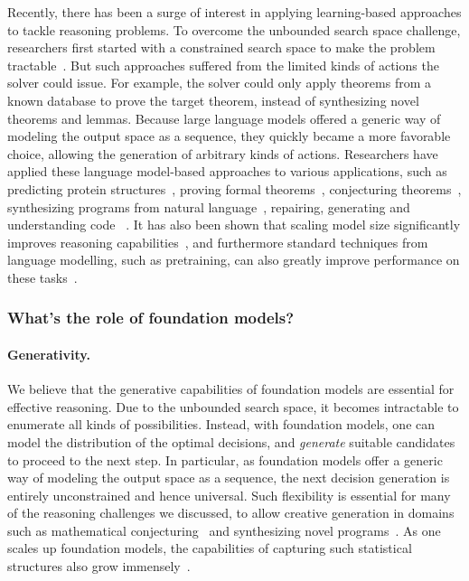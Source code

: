 Recently, there has been a surge of interest in applying learning-based approaches to tackle reasoning problems. To overcome the unbounded search space challenge, researchers first started with a constrained search space to make the problem tractable~\citep{DBLP:journals/corr/abs-1806-00608, DBLP:conf/icml/BansalLRSW19}. But such approaches suffered from the limited kinds of actions the solver could issue. For example, the solver could only apply theorems from a known database to prove the target theorem, instead of synthesizing novel theorems and lemmas. Because large language models offered a generic way of modeling the output space as a sequence, they quickly became a more favorable choice, allowing the generation of arbitrary kinds of actions. Researchers have applied these language model-based approaches to various applications, such as predicting protein structures~\citep{DBLP:journals/nature/Senior0JKSGQZNB20}, proving formal theorems~\citep{DBLP:journals/corr/polu2020generative,pact},  conjecturing theorems~\citep{DBLP:conf/mkm/UrbanJ20,DBLP:journals/corr/abs-2006-04757,li2021isarstep}, synthesizing programs from natural language~\cite{chen2021evaluating,ling2016latent}, repairing, generating and understanding code ~\citep{yasunaga2021break,DBLP:journals/corr/abs-2102-04664,guo2020graphcodebert,svyatkovskiy2020intellicode,kim2021code,zugner2021language}. It has also been shown that scaling model size significantly improves reasoning capabilities~\citep{DBLP:journals/corr/polu2020generative}, and furthermore standard techniques from language modelling, such as pretraining, can also greatly improve performance on these tasks~\citep{DBLP:journals/corr/abs-2006-04757,DBLP:journals/corr/polu2020generative}.

\subsubsection{What's the role of foundation models?}
\label{sec:reasoning-role}

\paragraph{Generativity.} We believe that the generative capabilities of foundation models are essential for effective reasoning. Due to the unbounded search space, it becomes intractable to enumerate all kinds of possibilities. Instead, with foundation models, one can model the distribution of the optimal decisions, and \emph{generate} suitable candidates to proceed to the next step. In particular, as foundation models offer a generic way of modeling the output space as a sequence, the next decision generation is entirely unconstrained and hence universal. Such flexibility is essential for many of the reasoning challenges we discussed, to allow creative generation in domains such as mathematical conjecturing~\cite{li2021isarstep} and synthesizing novel programs~\cite{chen2021evaluating}. As one scales up foundation models, the capabilities of capturing such statistical structures also grow immensely~\citep{DBLP:journals/corr/polu2020generative}.

